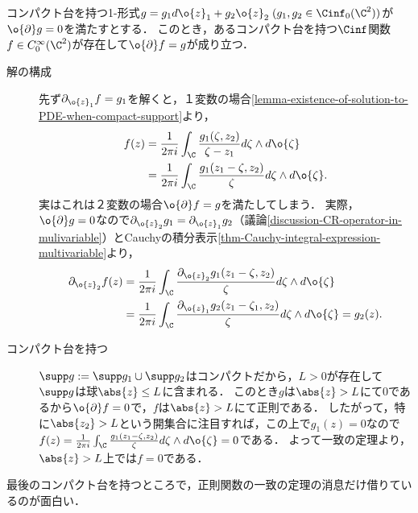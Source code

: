\documentclass[uplatex, dvipdfmx]{jsreport}
\begin{document}
\begin{theorem}[十分性]\label{thm-CR-operator-in-multivariable-is-epic}
    コンパクト台を持つ1-形式$g=g_1d\o{z}_1+g_2\o{z}_2\;(g_1,g_2\in\Cinf_0(\C^2))$が$\o{\partial}g=0$を満たすとする．
    このとき，あるコンパクト台を持つ$\Cinf$関数$f\in C_0^\infty(\C^2)$が存在して$\o{\partial}f=g$が成り立つ．
\end{theorem}
\begin{Proof}\mbox{}
    \begin{description}
        \item[解の構成] 先ず$\partial_{\o{z}_1}f=g_1$を解くと，１変数の場合\ref{lemma-existence-of-solution-to-PDE-when-compact-support}より，
        \begin{align*}
            f(z)&=\frac{1}{2\pi i}\int_\C\frac{g_1(\zeta,z_2)}{\zeta-z_1}d\zeta\wedge d\o{\zeta}\\
            &=\frac{1}{2\pi i}\int_\C\frac{g_1(z_1-\zeta,z_2)}{\zeta}d\zeta\wedge d\o{\zeta}.
        \end{align*}
        実はこれは２変数の場合$\o{\partial}f=g$を満たしてしまう．
        実際，$\o{\partial}g=0$なので$\partial_{\o{z}_2}g_1=\partial_{\o{z}_1}g_2$（議論\ref{discussion-CR-operator-in-mulivariable}）とCauchyの積分表示\ref{thm-Cauchy-integral-expression-multivariable}より，
        \begin{align*}
            \partial_{\o{z}_2}f(z)&=\frac{1}{2\pi i}\int_\C\frac{\partial_{\o{z}_2}g_1(z_1-\zeta,z_2)}{\zeta}d\zeta\wedge d\o{\zeta}\\
            &=\frac{1}{2\pi i}\int_\C\frac{\partial_{\o{z}_1}g_2(z_1-\zeta_1,z_2)}{\zeta}d\zeta\wedge d\o{\zeta}=g_2(z).
        \end{align*}
        \item[コンパクト台を持つ]
        $\supp g:=\supp g_1\cup\supp g_2$はコンパクトだから，$L>0$が存在して$\supp g$は球$\abs{z}\le L$に含まれる．
        このとき$g$は$\abs{z}>L$にて$0$であるから$\o{\partial}f=0$で，$f$は$\abs{z}>L$にて正則である．
        したがって，特に$\abs{z_2}>L$という開集合に注目すれば，この上で$g_1(z)=0$なので$f(z)=\frac{1}{2\pi i}\int_\C\frac{g_1(z_1-\zeta,z_2)}{\zeta}d\zeta\wedge d\o{\zeta}=0$である．
        よって一致の定理より，$\abs{z}>L$上では$f=0$である．
    \end{description}
\end{Proof}
\begin{remarks}
    最後のコンパクト台を持つところで，正則関数の一致の定理の消息だけ借りているのが面白い．
\end{remarks}
\end{document}
